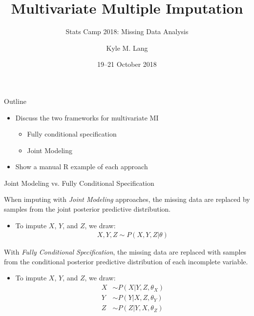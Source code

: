 \documentclass{beamer}\usepackage[]{graphicx}\usepackage[]{color}
\title{Multivariate Multiple Imputation}
\subtitle{Stats Camp 2018: Missing Data Analysis}
\author{Kyle M. Lang}
\institute{Department of Methodology \& Statistics\\Tilburg University}
\date{19--21 October 2018}
\begin{document}




\begin{frame}[t,plain]
    
  \titlepage
  
\end{frame}


\begin{frame}{Outline}
  
  \begin{itemize}
  \item Discuss the two frameworks for multivariate MI
    \vc
    \begin{itemize}
    \item Fully conditional specification
      \vc
    \item Joint Modeling
    \end{itemize}
    \vb
  \item Show a manual \textsf{R} example of each approach
  \end{itemize}
  
\end{frame}


\begin{frame}{Joint Modeling vs. Fully Conditional Specification}

  When imputing with \emph{Joint Modeling} approaches, the missing data are 
  replaced by samples from the joint posterior predictive distribution.
  \vb
  \begin{itemize}
    \item To impute $X$, $Y$, and $Z$, we draw:
      \begin{align*}
        X, Y, Z \sim P(X, Y, Z | \theta)
      \end{align*}
  \end{itemize}
  \vb
  With \emph{Fully Conditional Specification}, the missing data are replaced 
  with samples from the conditional posterior predictive distribution of each 
  incomplete variable.
  \vb
  \begin{itemize}
  \item To impute $X$, $Y$, and $Z$, we draw:
    \begin{align*}
      X &\sim P(X | Y, Z, \theta_X)\\
      Y &\sim P(Y | X, Z, \theta_Y)\\
      Z &\sim P(Z | Y, X, \theta_Z)
    \end{align*}
  \end{itemize}
  
\end{frame}
\end{document}
